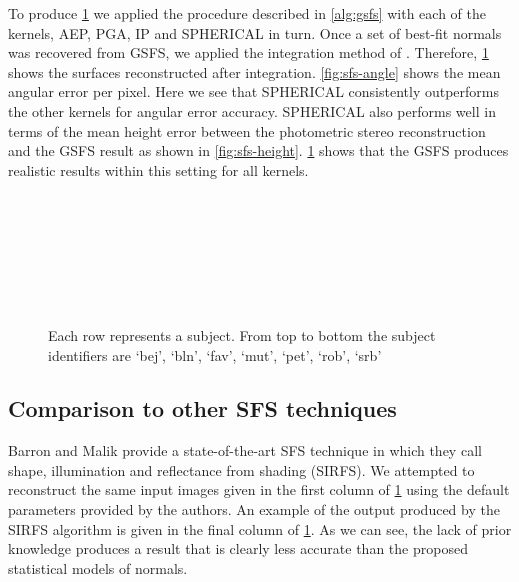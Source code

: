 To produce \cref{fig:sfs-results} we applied the procedure described in 
\cref{alg:gsfs} with each of the kernels, AEP, PGA, IP and SPHERICAL 
in turn. Once a set of best-fit normals was recovered from GSFS, we applied 
the integration method of \citet{frankot1988method}. 
Therefore, \cref{fig:sfs-results} shows the surfaces reconstructed 
after integration. \cref{fig:sfs-angle} shows the mean angular error 
per pixel. Here we see that SPHERICAL consistently outperforms the other 
kernels for angular error accuracy. SPHERICAL also performs well in terms of 
the mean height error between the photometric stereo reconstruction and the 
GSFS result as shown in \cref{fig:sfs-height}. \cref{fig:sfs-results} 
shows that the GSFS produces realistic results within this setting for all kernels.
\begin{figure}
    \centering
     \\
     \\
     \\
     \\
     \\
     \\
    \caption{Each row represents a subject. From top to bottom the subject 
             identifiers are `bej', `bln', `fav', `mut', `pet', `rob', `srb'}
\label{fig:sfs-results}
\end{figure}
\subsection{Comparison to other SFS techniques}\label{subsec:sfs-compare}
Barron and Malik provide a state-of-the-art SFS technique in 
\cite{barron2015shape} which they call shape, illumination and 
reflectance from shading (SIRFS). We attempted to reconstruct the same input 
images given in the first column of \cref{fig:sfs-results} using the 
default parameters provided by the authors. An example of the output produced 
by the SIRFS algorithm is given in the final column of \cref{fig:sfs-results}. 
As we can see, the lack of prior knowledge produces a result that is clearly 
less accurate than the proposed statistical models of normals.

